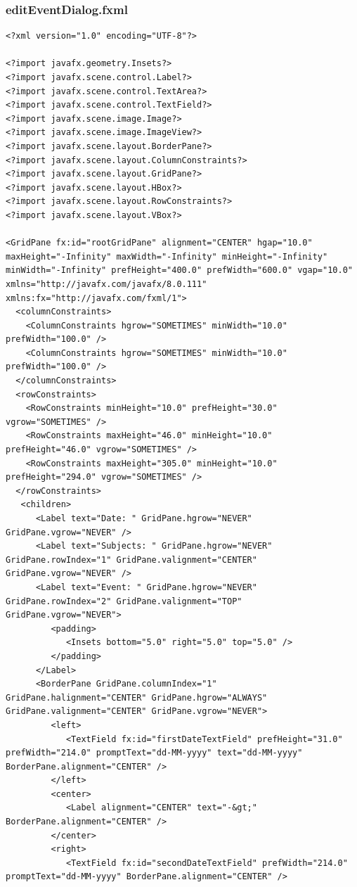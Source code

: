 \subsubsection{editEventDialog.fxml}
\begin{lstlisting}
<?xml version="1.0" encoding="UTF-8"?>

<?import javafx.geometry.Insets?>
<?import javafx.scene.control.Label?>
<?import javafx.scene.control.TextArea?>
<?import javafx.scene.control.TextField?>
<?import javafx.scene.image.Image?>
<?import javafx.scene.image.ImageView?>
<?import javafx.scene.layout.BorderPane?>
<?import javafx.scene.layout.ColumnConstraints?>
<?import javafx.scene.layout.GridPane?>
<?import javafx.scene.layout.HBox?>
<?import javafx.scene.layout.RowConstraints?>
<?import javafx.scene.layout.VBox?>

<GridPane fx:id="rootGridPane" alignment="CENTER" hgap="10.0" maxHeight="-Infinity" maxWidth="-Infinity" minHeight="-Infinity" minWidth="-Infinity" prefHeight="400.0" prefWidth="600.0" vgap="10.0" xmlns="http://javafx.com/javafx/8.0.111" xmlns:fx="http://javafx.com/fxml/1">
  <columnConstraints>
    <ColumnConstraints hgrow="SOMETIMES" minWidth="10.0" prefWidth="100.0" />
    <ColumnConstraints hgrow="SOMETIMES" minWidth="10.0" prefWidth="100.0" />
  </columnConstraints>
  <rowConstraints>
    <RowConstraints minHeight="10.0" prefHeight="30.0" vgrow="SOMETIMES" />
    <RowConstraints maxHeight="46.0" minHeight="10.0" prefHeight="46.0" vgrow="SOMETIMES" />
    <RowConstraints maxHeight="305.0" minHeight="10.0" prefHeight="294.0" vgrow="SOMETIMES" />
  </rowConstraints>
   <children>
      <Label text="Date: " GridPane.hgrow="NEVER" GridPane.vgrow="NEVER" />
      <Label text="Subjects: " GridPane.hgrow="NEVER" GridPane.rowIndex="1" GridPane.valignment="CENTER" GridPane.vgrow="NEVER" />
      <Label text="Event: " GridPane.hgrow="NEVER" GridPane.rowIndex="2" GridPane.valignment="TOP" GridPane.vgrow="NEVER">
         <padding>
            <Insets bottom="5.0" right="5.0" top="5.0" />
         </padding>
      </Label>
      <BorderPane GridPane.columnIndex="1" GridPane.halignment="CENTER" GridPane.hgrow="ALWAYS" GridPane.valignment="CENTER" GridPane.vgrow="NEVER">
         <left>
            <TextField fx:id="firstDateTextField" prefHeight="31.0" prefWidth="214.0" promptText="dd-MM-yyyy" text="dd-MM-yyyy" BorderPane.alignment="CENTER" />
         </left>
         <center>
            <Label alignment="CENTER" text="-&gt;" BorderPane.alignment="CENTER" />
         </center>
         <right>
            <TextField fx:id="secondDateTextField" prefWidth="214.0" promptText="dd-MM-yyyy" BorderPane.alignment="CENTER" />

\end{lstlisting}
